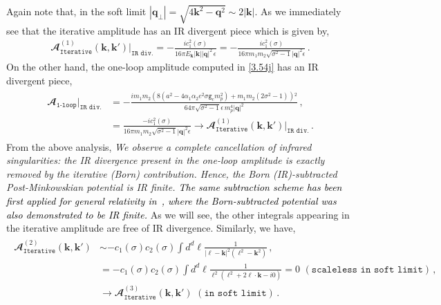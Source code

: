 Again note that, in the soft limit $|\boldsymbol{q}_\perp|=\sqrt{4\boldsymbol{k}^2-\boldsymbol{q}^2}\sim {2}|\boldsymbol{k}|$.
As we immediately see that the iterative amplitude has an IR divergent piece which is given by,
\begin{align}
    \mathbfcal{A}_{\texttt{Iterative}}^{(1)}(\boldsymbol{k},\boldsymbol{k'})\Bigg|_{\texttt{IR div.}}= -\frac{i c_1^2(\sigma)}{16 \pi E_{\boldsymbol{k}}|\boldsymbol{k}||\boldsymbol{q}|^2\,\epsilon}=-\frac{ic_1^2(\sigma)}{16\pi m_1 m_2 \sqrt{\sigma^2-1}|\boldsymbol{q}|^2\epsilon}\,.
\end{align}
On the other hand,  the one-loop amplitude computed in \eqref{3.54j} has an IR divergent piece,
\begin{align}
    \begin{split}\mathbfcal{A}_{\texttt{1-loop}}\Bigg|_{\texttt{IR div.}}&=-\frac{i m_1 m_2 \left(8 \left(a^2-4 \alpha _1 \alpha _2 e^2 \sigma  \texttt{g}_c m_p^2\right)+m_1 m_2 \left(2 \sigma ^2-1\right)\right){}^2}{64 \pi  \sqrt{\sigma ^2-1} \epsilon \, m_p^4 |\boldsymbol{q}|^2}\,,\\ & =\frac{-ic_1^2(\sigma)}{16\pi m_1 m_2\sqrt{\sigma^2-1}|\boldsymbol{q}|^2\epsilon}\to \mathbfcal{A}_{\texttt{Iterative}}^{(1)}(\boldsymbol{k},\boldsymbol{k'})\Bigg|_{\texttt{IR div.}} \,.
    \end{split}
\end{align}
From the above analysis, \textit{We observe a complete cancellation of infrared singularities: the IR divergence present in the one-loop amplitude is exactly removed by the iterative (Born) contribution. Hence, the Born (IR)-subtracted Post-Minkowskian potential is IR finite. \textcolor{black}{The same subtraction scheme has been first applied for general relativity in~\cite{Cristofoli:2019neg}, where the Born-subtracted potential was also demonstrated to be IR finite.}}   As we will see, the other integrals appearing in the iterative amplitude are free of IR divergence.
Similarly, we have,
\begin{align}
    \begin{split}
        \mathbfcal{A}_{\texttt{Iterative}}^{(2)}(\boldsymbol{k},\boldsymbol{k'})&\sim-c_1(\sigma)c_2(\sigma)\int d^d\boldsymbol{\ell}\frac{1}{|\boldsymbol{\ell}-\boldsymbol{k}|^2(\boldsymbol{\ell}^2-\boldsymbol{k}^2)}\,,\\ &
        =-c_1(\sigma)c_2(\sigma)\int d^d\boldsymbol{\ell}\frac{1}{\boldsymbol{\ell}^2(\boldsymbol{\ell}^2+2\boldsymbol{\ell}\cdot\boldsymbol{k}-i0)}=0\,\, (\texttt{scaleless in soft limit})\,,\\ &
        \to \mathbfcal{A}_{\texttt{Iterative}}^{(3)}(\boldsymbol{k},\boldsymbol{k'}) \,\,(\texttt{in soft limit})\,.
    \end{split}
\end{align}
